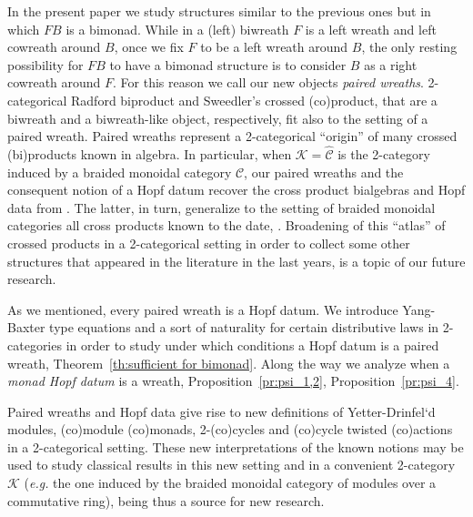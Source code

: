 \documentclass[a4paper, 12pt]{article}
\renewcommand{\_}[1]{\mbox{$_{\left( #1 \right)}$}}
\theoremstyle{plain}
\newcommand{\EM}{{\rm EM}}
\newcommand{\C}{{\mathcal C}}
\def\K{{\mathcal K}}  %
\newcommand{\thref}[1]{Theorem~\ref{th:#1}}
\newcommand{\prref}[1]{Proposition~\ref{pr:#1}}
\begin{document}
In the present paper we study structures similar to the previous ones but in which $FB$ is a bimonad. %
While in a (left) biwreath $F$ is a left wreath and left cowreath around $B$, once we fix $F$ to be a left wreath around $B$, the only resting possibility for $FB$ to have a bimonad 
structure is to consider $B$ as a right cowreath around $F$. For this reason we call our new objects {\em paired wreaths}. 
2-categorical Radford biproduct and Sweedler's crossed (co)product, that are a biwreath and a biwreath-like object, respectively, fit also to the setting of a paired wreath. 
Paired wreaths represent a 2-categorical ``origin'' of many crossed (bi)products known in algebra. In particular, when $\K=\hat\C$ is the 2-category induced by a braided monoidal category $\C$, 
our paired wreaths and the consequent notion of a Hopf datum recover the cross product bialgebras and Hopf data from \cite{BD}. The latter, in turn, generalize 
to the setting of braided monoidal categories all cross products known to the date, \cite{Maj5, Maj6, Sch3, BD1}. Broadening of this ``atlas'' of crossed products in a 2-categorical setting 
in order to collect some other structures that appeared in the literature in the last years, is a topic of our future research. 

As we mentioned, every paired wreath is a Hopf datum. We introduce Yang-Baxter type equations and a sort of naturality for certain distributive laws in 2-categories in order to study 
under which conditions a Hopf datum is a paired wreath, \thref{sufficient for bimonad}. Along the way we analyze when a {\em monad Hopf datum} is a wreath, \prref{psi_1,2}, \prref{psi_4}. 

Paired wreaths and Hopf data give rise to new definitions of Yetter-Drinfel`d modules, (co)module (co)monads, 2-(co)cycles and (co)cycle twisted (co)actions in a 2-categorical setting. 
These new interpretations of the known notions may be used to study classical results in this new setting and in a convenient 2-category $\K$ ({\em e.g.} the one induced by the braided 
monoidal category of modules over a commutative ring), being thus a source for new research. 

\bigskip
\end{document}
